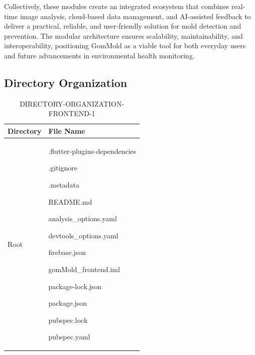 \documentclass[conference]{IEEEtran}
\begin{document}
Collectively, these modules create an integrated ecosystem that combines real-time image analysis, cloud-based data management, and AI-assisted feedback to deliver a practical, reliable, and user-friendly solution for mold detection and prevention. The modular architecture ensures scalability, maintainability, and interoperability, positioning GomMold as a viable tool for both everyday users and future advancements in environmental health monitoring.


\subsection{Directory Organization} 
\begin{table}[h]
\caption{DIRECTORY-ORGANIZATION-FRONTEND-1}
\def\arraystretch{1.24} \small
    \begin{tabular}{|p{3.7cm}|p{4.1cm}|}
\hline
Directory & File Name \\ \hline
          Root  & .flutter-plugins-dependencies \par .gitignore \par .metadata \par README.md \par analysis\_options.yaml \par devtools\_options.yaml \par firebase.json \par gomMold\_frontend.iml \par package-lock.json \par package.json \par pubspec.lock \par pubspec.yaml
          \\ \hline
\end{tabular}
\end{table}
\newpage
\end{document}

